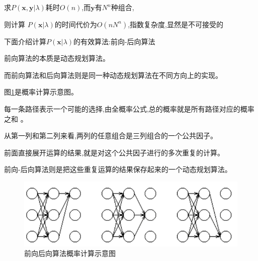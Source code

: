 \documentclass[UTF8,a4paper]{ctexart}%
\begin{document}
            求$P(\bm{x,y}|\lambda)$耗时$O(n)$,而$\bm{y}$有$N^n$种组合,

            则计算 $P(\bm{x}|\lambda)$的时间代价为{\color{red}$O(nN^n)$},指数复杂度,显然是不可接受的

            下面介绍计算$P(\bm{x}|\lambda)$的有效算法:前向-后向算法

            {\color{blue}
                前向算法的本质是动态规划算法。

                而前向算法和后向算法则是同一种动态规划算法在不同方向上的实现。
            }


            图\ref{fig2017-5-1819:40:09}是概率计算示意图。

            每一条路径表示一个可能的选择,由全概率公式,总的概率就是所有路径对应的概率之和 。

            从第一列和第二列来看,两列的任意组合是三列组合的一个公共因子。

            前面直接展开运算的结果,就是对这个公共因子进行的多次重复的计算。

            前向-后向算法则是把这些重复运算的结果保存起来的一个动态规划算法。

            \begin{figure}[!htbp]
              \centering
              \includegraphics[scale=0.5]{assets/jiqixuexi4_36b94.png}
              \caption{前向后向算法概率计算示意图}
              \label{fig2017-5-1819:40:09}
            \end{figure}
\end{document}
